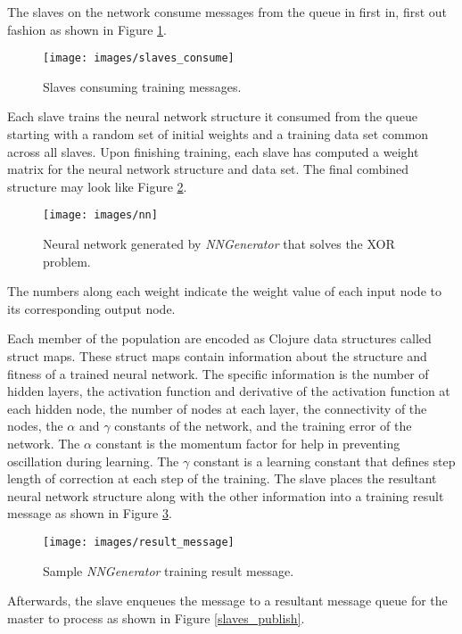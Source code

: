 The slaves on the network consume messages from the queue in first in, first out fashion as shown in Figure \ref{slaves_consume}.

\begin{figure}[htb!]
  \centering
  \texttt{[image: images/slaves\_consume]}
  \caption{Slaves consuming training messages.}
  \label{slaves_consume}
\end{figure}

Each slave trains the neural network structure it consumed from the queue starting with a random set of initial weights and a training data set common across all slaves.
Upon finishing training, each slave has computed a weight matrix for the neural network structure and data set.
The final combined structure may look like Figure \ref{nn_combined}. 

\begin{figure}[htb!]
  \centering
  \texttt{[image: images/nn]}
  \caption{Neural network generated by {\it NNGenerator} that solves the XOR problem.}
  \label{nn_combined}
\end{figure}

The numbers along each weight indicate the weight value of each input node to its corresponding output node. 

Each member of the population are encoded as Clojure data structures called struct maps. 
These struct maps contain information about the structure and fitness of a trained neural network. 
The specific information is the number of hidden layers, the activation function and derivative of the activation function at each hidden node, the number of nodes at each layer, the connectivity of the nodes, the $\alpha$ and $\gamma$ constants of the network, and the training error of the network. 
The $\alpha$ constant is the momentum factor for help in preventing oscillation during learning. 
The $\gamma$ constant is a learning constant that defines step length of correction at each step of the training.
The slave places the resultant neural network structure along with the other information into a training result message as shown in Figure \ref{result_message}.

\begin{figure}[htb!]
  \centering
  \texttt{[image: images/result\_message]}
  \caption{Sample {\it NNGenerator} training result message.}
  \label{result_message}
\end{figure}

Afterwards, the slave enqueues the message to a resultant message queue for the master to process as shown in Figure \ref{slaves_publish}.

